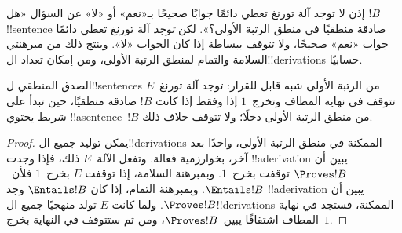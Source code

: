 \documentclass[../../../include/open-logic-section]{subfiles}
\begin{document}
\begin{explain}
إذن لا توجد آلة تورنغ تعطي دائمًا جوابًا صحيحًا بـ«نعم» أو «لا» عن
السؤال «هل $!B$ !!{sentence} صادقة منطقيًا في منطق الرتبة الأولى؟».
لكن \emph{توجد} آلة تورنغ تعطي دائمًا جواب «نعم» صحيحًا، ولا تتوقف
ببساطة إذا كان الجواب «لا». وينتج ذلك من مبرهنتي السلامة والتمام
لمنطق الرتبة الأولى، ومن إمكان تعداد ال!!{derivation}s حسابيًا.
\end{explain}

\begin{thm}
  الصدق المنطقي ل!!{sentence}s من الرتبة الأولى شبه قابل للقرار: توجد
  آلة تورنغ~$E$ تتوقف في نهاية المطاف وتخرج~$1$ إذا وفقط إذا كانت
  $!B$ صادقة منطقيًا، حين تبدأ على شريط يحتوي !!a{sentence}~$!B$ من
  منطق الرتبة الأولى دخلًا؛ ولا تتوقف خلاف ذلك.
\end{thm}

\begin{proof}
  يمكن توليد جميع ال!!{derivation}s الممكنة في منطق الرتبة الأولى،
  واحدًا بعد آخر، بخوارزمية فعالة. وتفعل الآلة~$E$ ذلك، فإذا وجدت
  !!a{derivation} يبين أن $\Proves !B$ توقفت بخرج~$1$. وبمبرهنة
  السلامة، إذا توقفت $E$ بخرج~$1$ فلأن~$\Entails !B$. وبمبرهنة
  التمام، إذا كان $\Entails !B$ وجد !!a{derivation} يبين أن
  $\Proves !B$. ولما كانت $E$ تولد منهجيًا جميع ال!!{derivation}s
  الممكنة، فستجد في نهاية المطاف اشتقاقًا يبين~$\Proves !B$، ومن ثم
  ستتوقف في النهاية بخرج~$1$.
\end{proof}
\end{document}
